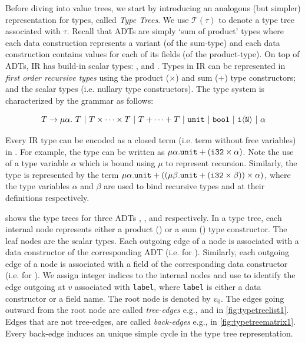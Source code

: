 Before diving into value trees, we start by introducing an analogous (but simpler) representation for types, called {\em Type Trees}.
We use $\mathcal{T}(\tau)$ to denote a type tree associated with $\tau$.
Recall that ADTs are simply `sum of product' types where each data construction represents a variant (of the sum-type) and
each data construction contains values for each of its fields (of the product-type).
On top of ADTs, IR has build-in scalar types: ,  and .
Types in IR can be represented in {\em first order recursive types} \cite{recursivetypestrees} using the product ($\times$) and sum ($+$) type
constructors; and the scalar types (i.e. nullary type constructors).
The type system is characterized by the grammar \typegrammar{} as follows:

$$
T \rightarrow \mu \alpha. \ T \ |\ T \times \dots \times T \ |\  T + \dots + T \ |\  \type{unit} \ |\ \type{bool} \ |\  \type{i\langle N \rangle} \ |\ \alpha
$$

Every IR type can be encoded as a closed term (i.e. term without free variables) in \typegrammar{}.
For example, the  type can be written as $\mu \alpha. {\tt unit} + ({\tt i32} \times \alpha)$.
Note the use of a type variable $\alpha$ which is bound using $\mu$ to represent recursion.
Similarly, the  type is represented by the term
$\mu \alpha. {\tt unit} + ((\mu \beta. {\tt unit} + ({\tt i32} \times \beta)) \times \alpha)$,
where the type variables $\alpha$ and $\beta$ are used to bind recursive types  and 
at their definitions respectively.



 shows the type trees for three ADTs , , and  respectively.
In a type tree, each internal node represents either a product (\prodn{}) or a sum (\sumn{}) type constructor.
The leaf nodes are the scalar types.
Each outgoing edge of a \sumn{} node is associated with a data constructor of the corresponding ADT (i.e.  for ).
Similarly, each outgoing edge of a \prodn{} node is associated with a field of the corresponding data constructor (i.e.  for ).
We assign integer indices to the internal nodes and use  to identify the edge outgoing at $v$ associated with {\tt label},
where {\tt label} is either a data constructor or a field name.
The root node is denoted by $v_0$.
The edges going outward from the root node are called {\em tree-edges} e.g.,  and  in \cref{fig:typetreelist1}.
Edges that are not tree-edges, are called {\em back-edges} e.g.,  in \cref{fig:typetreematrix1}.
Every back-edge induces an unique simple cycle in the type tree representation.

